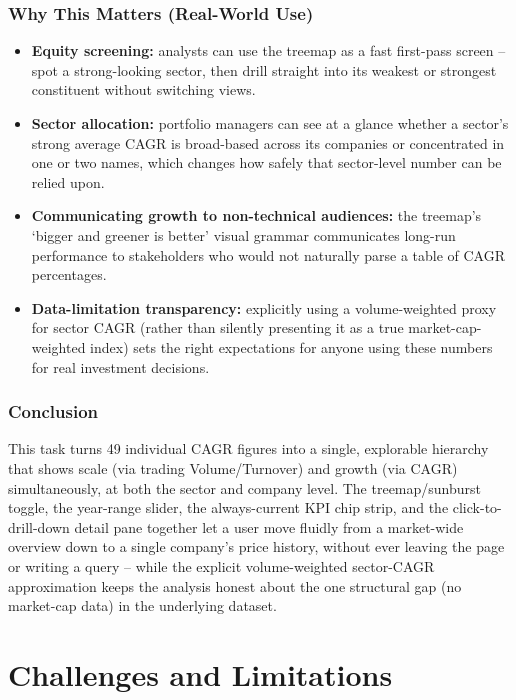 \documentclass[14pt,a4paper]{extreport}
\begin{document}
\subsection{Why This Matters (Real-World Use)}
\begin{itemize}
    \item \textbf{Equity screening:} analysts can use the treemap as a
        fast first-pass screen -- spot a strong-looking sector, then
        drill straight into its weakest or strongest constituent without
        switching views.
    \item \textbf{Sector allocation:} portfolio managers can see at a
        glance whether a sector's strong average CAGR is broad-based
        across its companies or concentrated in one or two names, which
        changes how safely that sector-level number can be relied upon.
    \item \textbf{Communicating growth to non-technical audiences:} the
        treemap's `bigger and greener is better' visual grammar
        communicates long-run performance to stakeholders who would not
        naturally parse a table of CAGR percentages.
    \item \textbf{Data-limitation transparency:} explicitly using a
        volume-weighted proxy for sector CAGR (rather than silently
        presenting it as a true market-cap-weighted index) sets the right
        expectations for anyone using these numbers for real investment
        decisions.
\end{itemize}

\subsection{Conclusion}
This task turns 49 individual CAGR figures into a single, explorable
hierarchy that shows scale (via trading Volume/Turnover) and growth (via
CAGR) simultaneously, at both the sector and company level. The
treemap/sunburst toggle, the year-range slider, the always-current KPI
chip strip, and the click-to-drill-down detail pane together let a user
move fluidly from a market-wide overview down to a single company's price
history, without ever leaving the page or writing a query -- while the
explicit volume-weighted sector-CAGR approximation keeps the analysis
honest about the one structural gap (no market-cap data) in the
underlying dataset.

\chapter{Challenges and Limitations}
\end{document}
